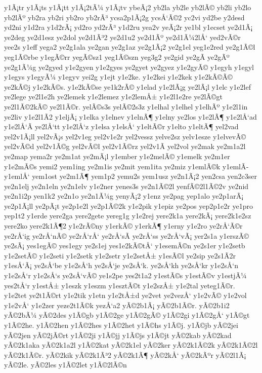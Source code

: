 {y1Ã¡tr
y1Ã¡ts
y1Ã¡tt
y1Ã¡2tÃ¼
y1Ã¡tv
ybeÃ¡2
yb2la
yb2le
yb2lÃ©
yb2li
yb2lo
yb2lÃº
yb2ra
yb2ri
yb2ro
yb2rÃ³
ycsa2p1Ã¡2g
ycsÅ‘Ã©2
yc2vi
yd2be
y2desd
yd2ni
y1d2ra
y1d2rÃ¡
yd2ro
yd2rÃ³
y1d2ru
yea2v
yeÃ¡2r
ye1bl
y1ecset
ye2d1Ã¡
ye2deg
ye2d1esz
ye2dol
ye2d1Ã³2
ye2d1u2
ye2d1Ãº
ye2d1Ã¼2lÅ‘
yed2vÃ©r
yee2s
y1eff
yega2
ye2g1ala
ye2gan
ye2g1az
ye2g1Ã¡2
ye2g1el
yeg1e2red
ye2g1Ã©l
yeg1Ã©rbe
y1egÃ©rr
yegÃ©sz1
yeg1Ã©szn
yeg3g2
ye2gid
ye2gÃ­
ye2gÃº
ye2g1Ã¼g
ye2gyed
y1e2gyen
y1e2gyes
ye2gyet
ye2gyez
y1e2gyÃ©
y1egyh
y1egyl
y1egys
y1egyÃ¼
y1egyv
yei2g
y1ejt
y1e2ke.
y1e2kei
y1e2kek
y1e2kÃ©Ã©
ye2kÃ©j
y1e2kÃ©s.
y1e2kÃ©se
ye1k2rÃ©
y1elad
y1e2lÃ¡g
ye2lÃ¡l
y1elc
y1e2lef
ye2lege
ye2l1e2h
ye2lemek
y1e2lemez
y1e2lemÅ±
y1e2l1e2re
ye2lÃ©gt
ye2l1Ã©2kÃ©
ye2l1Ã©r.
yelÃ©s3s
yelÃ©2s3z
y1elhal
y1elhel
y1elhÃº
y1e2l1in
ye2liv
y1e2l1Ã­2
y1eljÃ¡
y1elka
y1elnev
y1elnÃ¶
y1elny
ye2los
y1e2lÃ¶
y1e2lÅ‘ad
y1e2lÅ‘Ã­
ye2lÅ‘tt
y1e2lÅ‘z
y1elsa
y1elsÅ‘
y1eltÃ©r
y1elto
y1eltÃ¶
yel2vad
yel2v1Ã¡ll
yel2vÃ¡s
yel2v1eg
yel2v1e2r
yel2vessz
yelve2sz
yelv1esze
y1elvevÃ©
yel2vÃ©d
yel2v1Ã©g
yel2vÃ©l
yel2v1Ã©rz
yel2v1Ã­
yel2vol
ye2mak
ye2m1a2l
ye2map
yema2r
ye2m1at
ye2mÃ¡l
y1ember
y1e2melÃ©
y1emelk
ye2m1er
y1e2mÃ©s
yemi2
yem1ing
ye2m1is
ye2mit
yem1ita
ye2miz
y1emlÃ©k
y1emlÃ­
y1emlÅ‘
yem1ost
ye2m1Ã¶
yem1p2
yemu2s
yem1usz
ye2n1Ã¡2
yen2csa
yen2c3ser
ye2n1elj
ye2n1eln
ye2n1elv
y1e2ner
yenes3s
ye2n1Ã©2l
yenfÃ©2l1Ã©2v
ye2nid
ye2n1i2p
yen1k2
ye2n1o
ye2n1Ã¼g
yenyÃ¡2
y1enz
ye2pag
yep1alo
ye2p1arÃ¡
ye2p1Ã¡ll
ye2pÃ¡t
ye2p1e2l
ye2p1Ã©2k
y1e2pik
y1epiz
ye2pos
yep2p1e2r
ye1pro
yep1t2
y1erde
yere2ga
yere2gete
yereg1g
y1e2rej
yere2k1a
yere2kÃ¡
yere2k1e2sz
yere2ko
yere2k1Ã¶2
y1e2rÃ©ny
y1erkÃ©
y1erkÃ¶
y1erny
y1e2ro
ye2rÅ‘Ã©r
ye2rÅ‘ig
ye2rÅ‘nÃ©
ye2rÅ‘rÅ‘
ye2rÅ‘sÃ­
ye2rÅ‘ss
ye2rÅ‘vÃ¡
yer2s1a
y1erszÃ©
ye2sÃ¡
yes1egÃ©
yes1egy
ye2s1ej
yes1e2kÃ©tÅ‘
y1esemÃ©n
ye2s1er
y1e2setb
y1e2setÃ©
y1e2seti
y1e2setk
y1e2setr
y1e2setÅ±
y1esÃ©l
ye2sip
ye2s1Ã­2r
y1esÅ‘Ã¡
ye2sÅ‘be
y1e2sÅ‘h
ye2sÅ‘je
ye2sÅ‘k.
ye2sÅ‘kh
ye2sÅ‘kr
y1e2sÅ‘n
y1e2sÅ‘r
y1e2sÅ‘s
ye2sÅ‘vÃ©
ye1s2pe
yes2t1a2
y1estÃ©s
y1estÃ©v
y1estjÃ¼
yes2tÅ‘r
y1estÅ±
y1eszk
y1eszm
y1esztÃ©t
y1e2szÅ±
y1e2tal
yeteg1Ã©r.
y1e2tet
ye2t1Ã©rt
y1e2tik
y1etn
y1e2tÅ±d
ye2vet
ye2vezÅ‘
y1e2vÃ©
y1e2vol
y1e2vÅ‘
y1e2zer
yeze2t1Ã©k
yezÅ‘a2
yÃ©2b1Ã¡
yÃ©2b1Ã©r.
yÃ©2b1i2
yÃ©2bÃ¼
yÃ©2des
y1Ã©gb
y1Ã©2ge
y1Ã©2gÃ©
y1Ã©2gi
y1Ã©2gÅ‘
y1Ã©gt
y1Ã©2he.
y1Ã©2hen
y1Ã©2hes
y1Ã©2het
y1Ã©hs
y1Ã©j.
y1Ã©jb
yÃ©2jei
yÃ©2jen
yÃ©2jÃ©rt
y1Ã©2ji
y1Ã©jj
y1Ã©js
y1Ã©jt
yÃ©2kab
yÃ©2kad
yÃ©2k1aka
yÃ©2k1a2l
y1Ã©2kat
yÃ©2k1el
yÃ©2ker
yÃ©2k1Ã©2k
yÃ©2k1Ã©2l
yÃ©2k1Ã©r.
yÃ©2kik
yÃ©2k1Ã³2
yÃ©2k1Ã¶
yÃ©2kÅ‘
yÃ©2kÃºr
yÃ©2l1Ã¡
yÃ©2le.
yÃ©2les
y1Ã©2let
y1Ã©2lÃ©n
}
